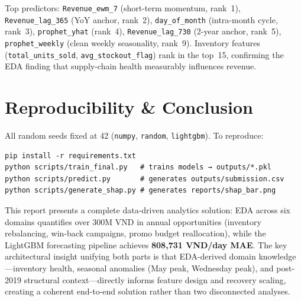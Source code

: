 \documentclass{article}
\begin{document}
Top predictors: \texttt{Revenue\_ewm\_7} (short-term momentum, rank~1), \texttt{Revenue\_lag\_365} (YoY anchor, rank~2), \texttt{day\_of\_month} (intra-month cycle, rank~3), \texttt{prophet\_yhat} (rank~4), \texttt{Revenue\_lag\_730} (2-year anchor, rank~5), \texttt{prophet\_weekly} (clean weekly seasonality, rank~9). Inventory features (\texttt{total\_units\_sold}, \texttt{avg\_stockout\_flag}) rank in the top~15, confirming the EDA finding that supply-chain health measurably influences revenue.

\section{Reproducibility \& Conclusion}

All random seeds fixed at 42 (\texttt{numpy}, \texttt{random}, \texttt{lightgbm}). To reproduce:
\begin{verbatim}
pip install -r requirements.txt
python scripts/train_final.py   # trains models → outputs/*.pkl
python scripts/predict.py       # generates outputs/submission.csv
python scripts/generate_shap.py # generates reports/shap_bar.png
\end{verbatim}

This report presents a complete data-driven analytics solution: EDA across six domains quantifies over 300M VND in annual opportunities (inventory rebalancing, win-back campaigns, promo budget reallocation), while the LightGBM forecasting pipeline achieves \textbf{808,731 VND/day MAE}. The key architectural insight unifying both parts is that EDA-derived domain knowledge---inventory health, seasonal anomalies (May peak, Wednesday peak), and post-2019 structural context---directly informs feature design and recovery scaling, creating a coherent end-to-end solution rather than two disconnected analyses.
\end{document}
